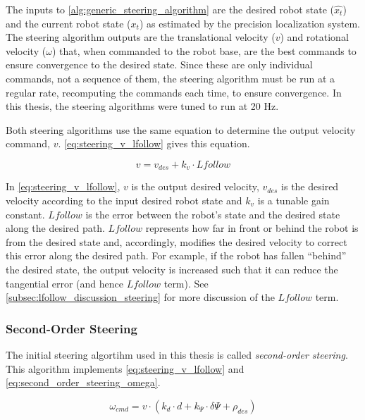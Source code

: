 The inputs to \autoref{alg:generic_steering_algorithm} are the desired robot state ($\hat{x_t}$) and the current robot state ($x_t$) as estimated by the precision localization system. The steering algorithm outputs are the translational velocity ($v$) and rotational velocity ($\omega$) that, when commanded to the robot base, are the best commands to ensure convergence to the desired state. Since these are only individual commands, not a sequence of them, the steering algorithm must be run at a regular rate, recomputing the commands each time, to ensure convergence. In this thesis, the steering algorithms were tuned to run at 20 Hz.

Both steering algorithms use the same equation to determine the output velocity command, $v$. \eqref{eq:steering_v_lfollow} gives this equation.

\begin{equation}
v = v_{des} + k_v \cdot Lfollow
\label{eq:steering_v_lfollow}
\end{equation}

In \eqref{eq:steering_v_lfollow}, $v$ is the output desired velocity, $v_{des}$ is the desired velocity according to the input desired robot state and $k_v$ is a tunable gain constant. $Lfollow$ is the error between the robot's state and the desired state along the desired path. $Lfollow$ represents how far in front or behind the robot is from the desired state and, accordingly, modifies the desired velocity to correct this error along the desired path. For example, if the robot has fallen ``behind'' the desired state, the output velocity is increased such that it can reduce the tangential error (and hence $Lfollow$ term). See \autoref{subsec:lfollow_discussion_steering} for more discussion of the $Lfollow$ term.

\subsubsection{Second-Order Steering}\label{subsubsec:second_order_steering}

The initial steering algortihm used in this thesis is called \emph{second-order steering}. This algorithm implements \eqref{eq:steering_v_lfollow} and \eqref{eq:second_order_steering_omega}.

\begin{equation}
\omega_{cmd} = v \cdot \left(k_d \cdot d + k_{\Psi} \cdot \delta\Psi + \rho_{des}\right)
\label{eq:second_order_steering_omega}
\end{equation}

